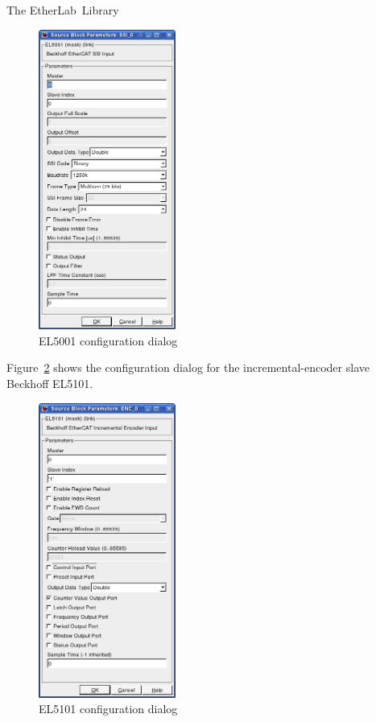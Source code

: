 \begin{ighsec}{The EtherLab\regTM\ Library}
\begin{figure}[H]
  \begin{center}
    \includegraphics[width=0.4\textwidth]{images/el5001.png}
    \caption{EL5001 configuration dialog}
    \label{fig:el5001}
  \end{center}
\end{figure}

Figure~\ref{fig:el5101} shows the configuration dialog for the
incremental-encoder slave Beckhoff EL5101.

\begin{figure}[H]
  \begin{center}
    \includegraphics[width=0.4\textwidth]{images/el5101.png}
    \caption{EL5101 configuration dialog}
    \label{fig:el5101}
  \end{center}
\end{figure}


\end{ighsec}
